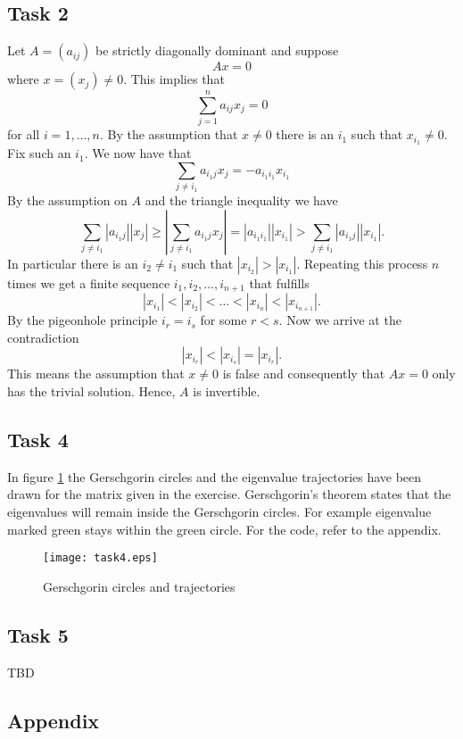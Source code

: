 \documentclass[a4paper,12pt]{article}
\begin{document}
\subsection*{Task 2}

Let \(A = (a_{ij})\) be strictly diagonally dominant and suppose
\[ Ax = 0 \]
where \(x = (x_j) \ne 0\).
This implies that
\[ \sum_{j=1}^n a_{ij} x_j = 0 \]
for all \(i = 1, \dots, n\).
By the assumption that \(x \ne 0\) there is an \(i_1\) such that
\(x_{i_1} \ne 0\).
Fix such an \(i_1\).
We now have that
\[ \sum_{j \ne i_1} a_{i_1j} x_j = -a_{i_1i_1}x_{i_1} \]
By the assumption on \(A\) and the triangle inequality we have
\[
  \sum_{j \ne i_1} |a_{i_1j}| |x_j|
    \ge \left| \sum_{j \ne i_1} a_{i_1j} x_j \right|
    = |a_{i_1i_1}| |x_{i_1}|
    > \sum_{j \ne i_1} |a_{i_1j}| |x_{i_1}|.
\]
In particular there is an \(i_2 \ne i_1\) such that \(|x_{i_2}| > |x_{i_1}|\).
Repeating this process \(n\) times we get a finite sequence
\(i_1, i_2, \dots, i_{n+1}\) that fulfills
\[ |x_{i_1}| < |x_{i_2}| < \dots < |x_{i_n}| < |x_{i_{n+1}}|. \]
By the pigeonhole principle \(i_r = i_s\) for some \(r < s\).
Now we arrive at the contradiction
\[ |x_{i_r}| < |x_{i_s}| = |x_{i_r}|. \]
This means the assumption that \(x \ne 0\) is false and consequently that
\(Ax = 0\) only has the trivial solution.
Hence, \(A\) is invertible.


\subsection*{Task 4}

In figure \ref{fig} the Gerschgorin circles and the eigenvalue trajectories have
been drawn for the matrix given in the exercise.
Gerschgorin's theorem states that the eigenvalues will remain inside the
Gerschgorin circles.
For example eigenvalue marked green stays within the green circle.
For the code, refer to the appendix.

\begin{figure}
  \centering
  \texttt{[image: task4.eps]}
  \caption{Gerschgorin circles and trajectories}
  \label{fig}
\end{figure}


\subsection*{Task 5}

TBD

\clearpage


\subsection*{Appendix}


\end{document}
